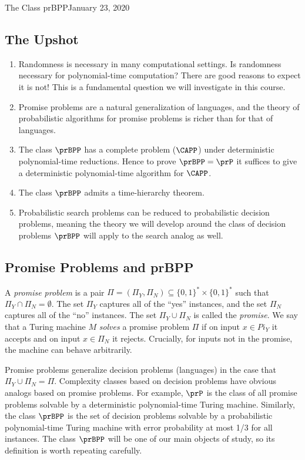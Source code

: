 \begin{lecture}{1}{The Class prBPP}{January 23, 2020}
\label{lec:01}

\subsection*{The Upshot}

\begin{enumerate}
  \item Randomness is necessary in many computational settings. Is randomness
    necessary for polynomial-time computation? There are good reasons to expect
    it is not! This is a fundamental question we will investigate in this
    course.
  \item Promise problems are a natural generalization of languages, and the
    theory of probabilistic algorithms for promise problems is richer than
    for that of languages.
  \item The class $\prBPP$ has a complete problem ($\CAPP$) under deterministic
    polynomial-time reductions. Hence to prove $\prBPP = \prP$ it suffices
    to give a deterministic polynomial-time algorithm for $\CAPP$.
  \item The class $\prBPP$ admits a time-hierarchy theorem.
  \item Probabilistic search problems can be reduced to probabilistic decision
    problems, meaning the theory we will develop around the class of decision
    problems $\prBPP$ will apply to the search analog as well.
\end{enumerate}

\subsection{Promise Problems and prBPP}

A \emph{promise problem} is a pair $\Pi = (\Pi_Y, \Pi_N) \subseteq \{0, 1\}^*
\times \{0, 1\}^*$ such that $\Pi_Y \cap \Pi_N = \emptyset$. The set $\Pi_Y$
captures all of the ``yes'' instances, and the set $\Pi_N$ captures all of the
``no'' instances. The set $\Pi_Y \cup \Pi_N$ is called the \emph{promise}. We
say that a Turing machine $M$ \emph{solves} a promise problem $\Pi$ if on
input $x \in Pi_Y$ it accepts and on input $x \in \Pi_N$ it rejects. Crucially,
for inputs not in the promise, the machine can behave arbitrarily.

Promise problems generalize decision problems (languages) in the case that
$\Pi_Y \cup \Pi_N = \Pi$. Complexity classes based on decision problems have
obvious analogs based on promise problems. For example, $\prP$ is the class of
all promise problems solvable by a deterministic polynomial-time Turing
machine. Similarly, the class $\prBPP$ is the set of decision problems solvable
by a probabilistic polynomial-time Turing machine with error probability at
most 1/3 for all instances. The class $\prBPP$ will be one of our main objects
of study, so its definition is worth repeating carefully.


\end{lecture}
